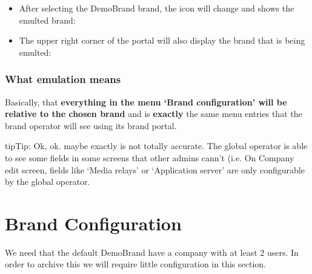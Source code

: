 \documentclass[letterpaper,10pt,english]{sphinxmanual}
\begin{document}
\begin{itemize}
\item {} 
After selecting the DemoBrand brand, the icon will change and shows the
emulted brand:

\end{itemize}

\begin{itemize}
\item {} 
The upper right corner of the portal will also display the brand that is being
emulted:

\end{itemize}



\subsubsection{What emulation means}
\label{internal_calls/god_portal:what-emulation-means}
Basically, that \textbf{everything in the menu `Brand configuration' will be relative
to the chosen brand} and is \textbf{exactly} the same menu entries that the brand
operator will see using its brand portal.

\begin{notice}{tip}{Tip:}
Ok, ok. maybe exactly is not totally accurate. The global operator is
able to see some fields in some screens that other admins cann't (i.e. On
Company edit screen, fields like `Media relays' or `Application server' are
only configurable by the global operator.
\end{notice}


\section{Brand Configuration}
\label{internal_calls/brand_portal::doc}\label{internal_calls/brand_portal:brand-configuration}
We need that the default DemoBrand have a company with at least 2 users. In
order to archive this we will require little configuration in this section.
\end{document}
